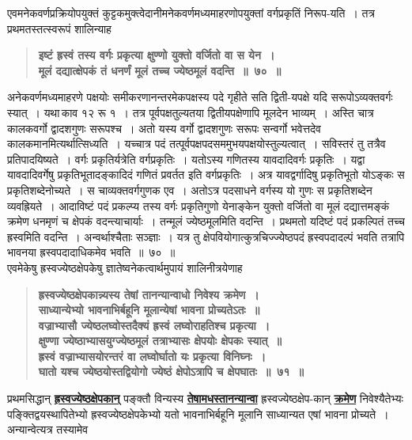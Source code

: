 \documentclass[11pt, openany]{book}
\begin{document}
\begin{sloppypar}
{\small एवमनेकवर्णप्रक्रियोपयुक्तं कुट्टकमुक्त्वेदानीमनेकवर्णमध्यमाहरणोपयुक्तां वर्गप्रकृतिं निरूप-यति~। तत्र प्रथमतस्तत्स्वरूपं शालिन्याह\textendash }

 \label{6.70}
\begin{quote}
{\large \textbf{{\color{purple}इष्टं ह्रस्वं तस्य वर्गः प्रकृत्या क्षुण्णो युक्तो वर्जितो वा स येन~।\\
मूलं दद्यात्क्षेपकं तं धनर्णं मूलं तच्च ज्येष्ठमूलं वदन्ति~॥~७०~॥}}}
\end{quote}

अनेकवर्णमध्यमाहरणे पक्षयोः समीकरणानन्तरमेकपक्षस्य पदे गृहीते सति द्विती-यपक्षे यदि सरूपोऽव्यक्तवर्गः स्यात्~। यथा\textendash \,काव १२ रू १~। तत्र पूर्वपक्षतुल्यतया द्वितीयपक्षेणापि मूलदेन भाव्यम्~। अस्ति चात्र कालकवर्गो द्वादशगुणः सरूपश्च~। अतो यस्य वर्गो द्वादशगुणः सरूपः सन्वर्गो भवेत्तदेव कालकमानमित्यर्थात्सिध्यति~। यच्चात्र पदं तत्पूर्वपक्षपदसममुभयपक्षयोस्तुल्यत्वात्~। सविस्तरं तु तत्रैव प्रतिपादयिष्यते~। वर्गः प्रकृतिर्यत्रेति वर्गप्रकृतिः~। यतोऽस्य गणितस्य यावदादिवर्गः प्रकृतिः~। यद्वा यावदादिवर्गेषु प्रकृतिभूतादङ्कादिदं गणितं प्रवर्तत इति वर्गप्रकृतिः~। अत्र यावद्वर्गादिषु प्रकृतिभूतो योऽङ्कः स प्रकृतिशब्देनोच्यते~। स चाव्यक्तवर्गगुणक एव~। अतोऽत्र पदसाधने वर्गस्य यो गुणः स प्रकृतिशब्देन व्यवह्रियते~। आदाविष्टं पदं प्रकल्प्य तस्य वर्गः प्रकृतिगुणो येनाङ्केन युक्तो वर्जितो वा मूलं दद्यात्तमङ्कं क्रमेण धनमृणं च क्षेपकं वदन्त्याचार्याः~। तन्मूलं ज्येष्ठमूलमिति वदन्ति~। प्रथमतो यदिष्टं पदं प्रकल्पितं तच्च ह्रस्वमिति वदन्ति~। अन्वर्थाश्चैताः सञ्ज्ञाः~। यत्र तु क्षेपवियोगात्कुत्रचिज्ज्येष्ठपदं ह्रस्वपदादल्पं भवति तत्रापि भावनया ह्रस्वपदादाधिकमेव भवति~॥~७०~॥\\

{\small एवमेकेषु ह्रस्वज्येष्ठक्षेपकेषु ज्ञातेष्वनेकत्वार्थमुपायं शालिनीत्रयेणाह\textendash }

 \label{6.71}
\begin{quote}
{\large \textbf{{\color{purple}ह्रस्वज्येष्ठक्षेपकान्न्यस्य तेषां तानन्यान्वाधो निवेश्य क्रमेण~।\\
साध्यान्येभ्यो भावनाभिर्बहूनि मूलान्येषां भावना प्रोच्यतेऽतः~॥\\
वज्राभ्यासौ ज्येष्ठलघ्वोस्तदैक्यं ह्रस्वं लघ्वोराहतिश्च प्रकृत्या~।\\
क्षुण्णा ज्येष्ठाभ्यासयुग्ज्येष्ठमूलं तत्राभ्यासः क्षेपयोः क्षेपकः स्यात्~॥\\
ह्रस्वं वज्राभ्यासयोरन्तरं वा लघ्वोर्घातो यः प्रकृत्या विनिघ्नः~।\\
घातो यश्च ज्येष्ठयोस्तद्वियोगो ज्येष्ठं क्षेपोऽत्रापि च क्षेपघातः~॥~७१~॥}}}
\end{quote}

प्रथमसिद्धान् \hyperref[6.71]{\textbf{ह्रस्वज्येष्ठक्षेपकान्}} पङ्क्तौ विन्यस्य \hyperref[6.71]{\textbf{तेषामधस्तानन्यान्वा}} ह्रस्वज्येष्ठक्षेप-कान् \hyperref[6.71]{\textbf{क्रमेण}} निवेश्यैतेभ्यः पङ्क्तिद्वयस्थापितेभ्यो ह्रस्वज्येष्ठक्षेपकेभ्यो यतो भावनाभिर्बहूनि मूलानि साध्यान्यत एषां भावना प्रोच्यते~। अन्यान्वेत्यत्र तस्यामेव
\end{sloppypar}
\end{document}
